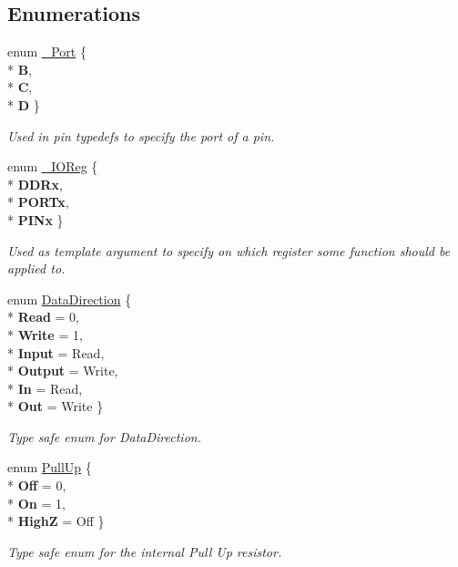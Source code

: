 \subsection*{Enumerations}
\begin{DoxyCompactItemize}
\item 
enum \hyperlink{namespaceports_a9949317f344930bd6ad1097e80c97b67}{\+\_\+\+Port} \{ \\*
{\bfseries B}, 
\\*
{\bfseries C}, 
\\*
{\bfseries D}
 \}\begin{DoxyCompactList}\small\item\em Used in pin {\ttfamily typedef}s to specify the port of a pin. \end{DoxyCompactList}
\item 
enum \hyperlink{namespaceports_a739630fb6b9a9b963453db8e865b6b14}{\+\_\+\+I\+O\+Reg} \{ \\*
{\bfseries D\+D\+Rx}, 
\\*
{\bfseries P\+O\+R\+Tx}, 
\\*
{\bfseries P\+I\+Nx}
 \}\begin{DoxyCompactList}\small\item\em Used as template argument to specify on which register some function should be applied to. \end{DoxyCompactList}
\item 
enum \hyperlink{namespaceports_a46987e78fa447129742fadda5eccafb4}{Data\+Direction} \{ \\*
{\bfseries Read} = 0, 
\\*
{\bfseries Write} = 1, 
\\*
{\bfseries Input} = Read, 
\\*
{\bfseries Output} = Write, 
\\*
{\bfseries In} = Read, 
\\*
{\bfseries Out} = Write
 \}\begin{DoxyCompactList}\small\item\em Type safe enum for Data\+Direction. \end{DoxyCompactList}
\item 
enum \hyperlink{namespaceports_a49bf0ccedb4cfed89a328574e53bec07}{Pull\+Up} \{ \\*
{\bfseries Off} = 0, 
\\*
{\bfseries On} = 1, 
\\*
{\bfseries HighZ} = Off
 \}\begin{DoxyCompactList}\small\item\em Type safe enum for the internal Pull Up resistor. \end{DoxyCompactList}
\end{DoxyCompactItemize}
